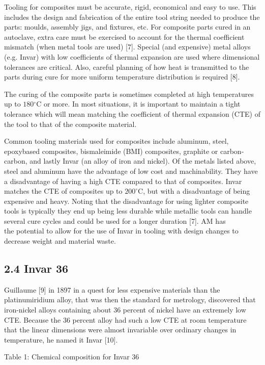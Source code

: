 \documentclass[10pt]{article}
\begin{document}
Tooling for composites must be accurate, rigid, economical and easy to use. This includes the design and fabrication of the entire tool string needed to produce the parts: moulds, assembly jigs, and fixtures, etc. For composite parts cured in an autoclave, extra care must be exercised to account for the thermal coefficient mismatch (when metal tools are used) [7]. Special (and expensive) metal alloys (e.g. Invar) with low coefficients of thermal expansion are used where dimensional tolerances are critical. Also, careful planning of how heat is transmitted to the parts during cure for more uniform temperature distribution is required [8].

The curing of the composite parts is sometimes completed at high temperatures up to $180{ }^{\circ} \mathrm{C}$ or more. In most situations, it is important to maintain a tight tolerance which will mean matching the coefficient of thermal expansion (CTE) of the tool to that of the composite material.

Common tooling materials used for composites include aluminum, steel, epoxybased composites, bismaleimide (BMI) composites, graphite or carbon-carbon, and lastly Invar (an alloy of iron and nickel). Of the metals listed above, steel and aluminum have the advantage of low cost and machinability. They have a disadvantage of having a high CTE compared to that of composites. Invar matches the CTE of composites up to $200^{\circ} \mathrm{C}$, but with a disadvantage of being expensive and heavy. Noting that the disadvantage for using lighter composite tools is typically they end up being less durable while metallic tools can handle several cure cycles and could be used for a longer duration [7]. AM has\\
the potential to allow for the use of Invar in tooling with design changes to decrease weight and material waste.

\subsection*{2.4 Invar 36}
Guillaume [9] in 1897 in a quest for less expensive materials than the platinumiridium alloy, that was then the standard for metrology, discovered that iron-nickel alloys containing about 36 percent of nickel have an extremely low CTE. Because the 36 percent alloy had such a low CTE at room temperature that the linear dimensions were almost invariable over ordinary changes in temperature, he named it Invar [10].

Table 1: Chemical composition for Invar 36
\end{document}
